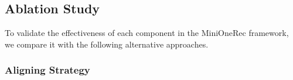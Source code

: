 

\subsection{Ablation Study}

To validate the effectiveness of each component in the MiniOneRec framework, we compare it with the following alternative approaches. 

\subsubsection{Aligning Strategy}

